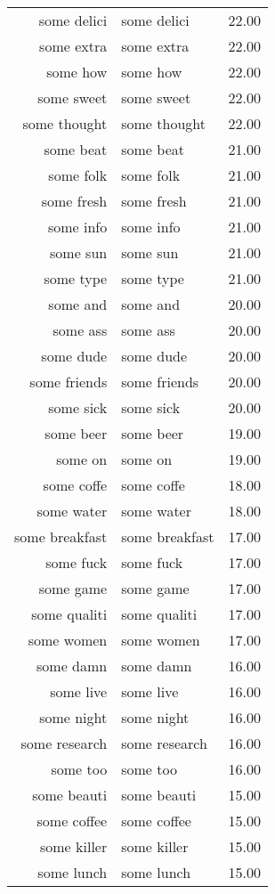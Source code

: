 \begin{table}[ht]
\begin{tabular}{rlr}
  some delici & some delici & 22.00 \\ 
  some extra & some extra & 22.00 \\ 
  some how & some how & 22.00 \\ 
  some sweet & some sweet & 22.00 \\ 
  some thought & some thought & 22.00 \\ 
  some beat & some beat & 21.00 \\ 
  some folk & some folk & 21.00 \\ 
  some fresh & some fresh & 21.00 \\ 
  some info & some info & 21.00 \\ 
  some sun & some sun & 21.00 \\ 
  some type & some type & 21.00 \\ 
  some and & some and & 20.00 \\ 
  some ass & some ass & 20.00 \\ 
  some dude & some dude & 20.00 \\ 
  some friends & some friends & 20.00 \\ 
  some sick & some sick & 20.00 \\ 
  some beer & some beer & 19.00 \\ 
  some on & some on & 19.00 \\ 
  some coffe & some coffe & 18.00 \\ 
  some water & some water & 18.00 \\ 
  some breakfast & some breakfast & 17.00 \\ 
  some fuck & some fuck & 17.00 \\ 
  some game & some game & 17.00 \\ 
  some qualiti & some qualiti & 17.00 \\ 
  some women & some women & 17.00 \\ 
  some damn & some damn & 16.00 \\ 
  some live & some live & 16.00 \\ 
  some night & some night & 16.00 \\ 
  some research & some research & 16.00 \\ 
  some too & some too & 16.00 \\ 
  some beauti & some beauti & 15.00 \\ 
  some coffee & some coffee & 15.00 \\ 
  some killer & some killer & 15.00 \\ 
  some lunch & some lunch & 15.00 \\ 

\end{tabular}
\end{table}
